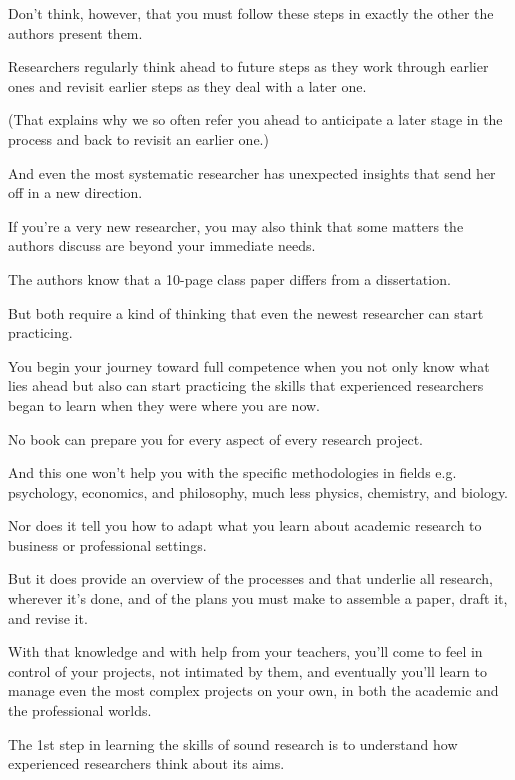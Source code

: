 \documentclass[oneside]{book}
\numberwithin{equation}{section}
\begin{document}
Don't think, however, that you must follow these steps in exactly the other the authors present them.

Researchers regularly think ahead to future steps as they work through earlier ones and revisit earlier steps as they deal with a later one.

(That explains why we so often refer you ahead to anticipate a later stage in the process and back to revisit an earlier one.)

And even the most systematic researcher has unexpected insights that send her off in a new direction.


%
If you're a very new researcher, you may also think that some matters the authors discuss are beyond your immediate needs.

The authors know that a 10-page class paper differs from a dissertation.

But both require a kind of thinking that even the newest researcher can start practicing.

You begin your journey toward full competence when you not only know what lies ahead but also can start practicing the skills that experienced researchers began to learn when they were where you are now.

%
No book can prepare you for every aspect of every research project.

And this one won't help you with the specific methodologies in fields e.g. psychology, economics, and philosophy, much less physics, chemistry, and biology.

Nor does it tell you how to adapt what you learn about academic research to business or professional settings.

%
But it does provide an overview of the processes and  that underlie all research, wherever it's done, and of the plans you must make to assemble a paper, draft it, and revise it.

With that knowledge and with help from your teachers, you'll come to feel in control of your projects, not intimated by them, and eventually you'll learn to manage even the most complex projects on your own, in both the academic and the professional worlds.

%
The 1st step in learning the skills of sound research is to understand how experienced researchers think about its aims.

\end{document}
